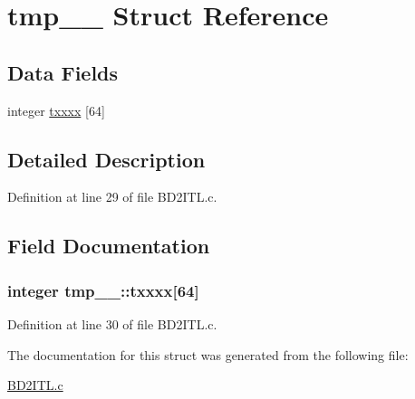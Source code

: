 \hypertarget{structtmp__1__}{}\section{tmp\+\_\+\_\+ Struct Reference}
\label{structtmp__1__}
\subsection*{Data Fields}
\begin{DoxyCompactItemize}
\item 
integer \hyperlink{structtmp__1___ad9c51d76906c0922240fb3cbcd33c90d}{txxxx} \mbox{[}64\mbox{]}
\end{DoxyCompactItemize}


\subsection{Detailed Description}


Definition at line 29 of file B\+D2\+I\+T\+L.\+c.



\subsection{Field Documentation}
\subsubsection[{\texorpdfstring{txxxx}{txxxx}}]{\setlength{\rightskip}{0pt plus 5cm}integer tmp\+\_\+\_\+\+::txxxx\mbox{[}64\mbox{]}}\hypertarget{structtmp__1___ad9c51d76906c0922240fb3cbcd33c90d}{}\label{structtmp__1___ad9c51d76906c0922240fb3cbcd33c90d}


Definition at line 30 of file B\+D2\+I\+T\+L.\+c.



The documentation for this struct was generated from the following file\+:\begin{DoxyCompactItemize}
\item 
\hyperlink{BD2ITL_8c}{B\+D2\+I\+T\+L.\+c}\end{DoxyCompactItemize}
